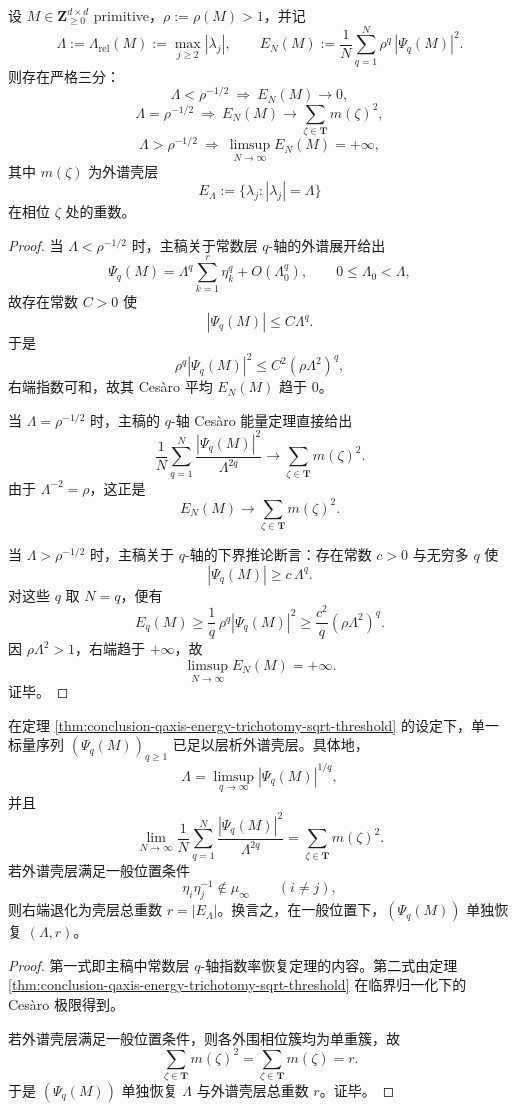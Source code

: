 \begin{theorem}\label{thm:conclusion-qaxis-energy-trichotomy-sqrt-threshold}
设 \(M\in \mathbf Z_{\ge 0}^{d\times d}\) primitive，\(\rho:=\rho(M)>1\)，并记
\[
\Lambda:=\Lambda_{\mathrm{rel}}(M):=\max_{j\ge 2}|\lambda_j|,
\qquad
E_N(M):=\frac1N\sum_{q=1}^N \rho^{q}\,|\Psi_q(M)|^2.
\]
则存在严格三分：
\[
\Lambda<\rho^{-1/2}\ \Longrightarrow\ E_N(M)\to 0,
\]
\[
\Lambda=\rho^{-1/2}\ \Longrightarrow\ E_N(M)\to \sum_{\zeta\in\mathbf T} m(\zeta)^2,
\]
\[
\Lambda>\rho^{-1/2}\ \Longrightarrow\ \limsup_{N\to\infty}E_N(M)=+\infty,
\]
其中 \(m(\zeta)\) 为外谱壳层
\[
E_\Lambda:=\{\lambda_j:|\lambda_j|=\Lambda\}
\]
在相位 \(\zeta\) 处的重数。
\end{theorem}
\begin{proof}
当 \(\Lambda<\rho^{-1/2}\) 时，主稿关于常数层 \(q\)-轴的外谱展开给出
\[
\Psi_q(M)=\Lambda^q\sum_{k=1}^r \eta_k^q+O(\Lambda_0^q),
\qquad
0\le \Lambda_0<\Lambda,
\]
故存在常数 \(C>0\) 使
\[
|\Psi_q(M)|\le C\Lambda^q.
\]
于是
\[
\rho^q|\Psi_q(M)|^2\le C^2(\rho\Lambda^2)^q,
\]
右端指数可和，故其 Ces\`aro 平均 \(E_N(M)\) 趋于 \(0\)。

当 \(\Lambda=\rho^{-1/2}\) 时，主稿的 \(q\)-轴 Ces\`aro 能量定理直接给出
\[
\frac1N\sum_{q=1}^N\frac{|\Psi_q(M)|^2}{\Lambda^{2q}}
\longrightarrow
\sum_{\zeta\in\mathbf T} m(\zeta)^2.
\]
由于 \(\Lambda^{-2}=\rho\)，这正是
\[
E_N(M)\longrightarrow \sum_{\zeta\in\mathbf T} m(\zeta)^2.
\]

当 \(\Lambda>\rho^{-1/2}\) 时，主稿关于 \(q\)-轴的下界推论断言：存在常数 \(c>0\) 与无穷多 \(q\) 使
\[
|\Psi_q(M)|\ge c\,\Lambda^q.
\]
对这些 \(q\) 取 \(N=q\)，便有
\[
E_q(M)
\ge
\frac1q\,\rho^q|\Psi_q(M)|^2
\ge
\frac{c^2}{q}(\rho\Lambda^2)^q.
\]
因 \(\rho\Lambda^2>1\)，右端趋于 \(+\infty\)，故
\[
\limsup_{N\to\infty}E_N(M)=+\infty.
\]
证毕。
\end{proof}

\begin{corollary}[外谱壳层的单通道层析]\label{cor:conclusion-outer-spectral-shell-single-channel-tomography}
在定理 \ref{thm:conclusion-qaxis-energy-trichotomy-sqrt-threshold} 的设定下，单一标量序列 \((\Psi_q(M))_{q\ge1}\) 已足以层析外谱壳层。具体地，
\[
\Lambda=\limsup_{q\to\infty} |\Psi_q(M)|^{1/q},
\]
并且
\[
\lim_{N\to\infty}\frac1N\sum_{q=1}^N\frac{|\Psi_q(M)|^2}{\Lambda^{2q}}
=
\sum_{\zeta\in\mathbf T}m(\zeta)^2 .
\]
若外谱壳层满足一般位置条件
\[
\eta_i\eta_j^{-1}\notin \mu_\infty \qquad (i\ne j),
\]
则右端退化为壳层总重数 \(r=|E_\Lambda|\)。换言之，在一般位置下，\((\Psi_q(M))\) 单独恢复 \((\Lambda,r)\)。
\end{corollary}
\begin{proof}
第一式即主稿中常数层 \(q\)-轴指数率恢复定理的内容。第二式由定理 \ref{thm:conclusion-qaxis-energy-trichotomy-sqrt-threshold} 在临界归一化下的 Ces\`aro 极限得到。

若外谱壳层满足一般位置条件，则各外围相位簇均为单重簇，故
\[
\sum_{\zeta\in\mathbf T}m(\zeta)^2
=
\sum_{\zeta\in\mathbf T}m(\zeta)
=
r.
\]
于是 \((\Psi_q(M))\) 单独恢复 \(\Lambda\) 与外谱壳层总重数 \(r\)。证毕。
\end{proof}

